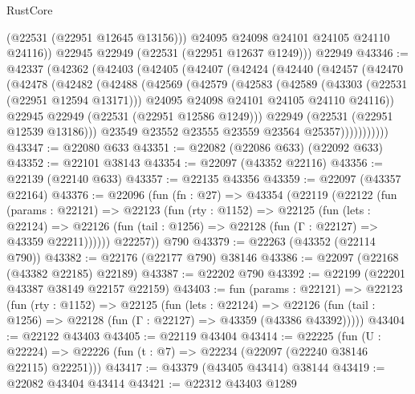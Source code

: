 \begin{lexlean}{RustCore}
\begin{coremodule}
            (@22531 (@22951 @12645 @13156)))
          @24095
          @24098
          @24101
          @24105
          @24110
          @24116))
      @22945
      @22949
      (@22531 (@22951 @12637 @1249)))
    @22949
@43346 := @42337
    (@42362
      (@42403
        (@42405
          (@42407
            (@42424
              (@42440
                (@42457
                  (@42470
                    (@42478
                      (@42482
                        (@42488
                          (@42569
                            (@42579
                              (@42583
                                (@42589
                                  (@43303 (@22531 (@22951 @12594 @13171)))
                                  @24095
                                  @24098
                                  @24101
                                  @24105
                                  @24110
                                  @24116))
                              @22945
                              @22949
                              (@22531 (@22951 @12586 @1249)))
                            @22949
                            (@22531 (@22951 @12539 @13186)))
                          @23549
                          @23552
                          @23555
                          @23559
                          @23564
                          @25357)))))))))))
@43347 := @22080 @633
@43351 := @22082 (@22086 @633) (@22092 @633)
@43352 := @22101 @38143
@43354 := @22097 (@43352 @22116)
@43356 := @22139 (@22140 @633)
@43357 := @22135 @43356
@43359 := @22097 (@43357 @22164)
@43376 := @22096
    (fun (fn : @27) =>
    @43354
      (@22119
        (@22122
          (fun (params : @22121) =>
          @22123
            (fun (rty : @1152) =>
            @22125
              (fun (lets : @22124) =>
              @22126 (fun (tail : @1256) => @22128 (fun (Γ : @22127) => @43359 @22211))))))
        @22257))
    @790
@43379 := @22263 (@43352 (@22114 @790))
@43382 := @22176 (@22177 @790) @38146
@43386 := @22097 (@22168 (@43382 @22185) @22189)
@43387 := @22202 @790
@43392 := @22199 (@22201 @43387 @38149 @22157 @22159)
@43403 := fun (params : @22121) =>
  @22123
    (fun (rty : @1152) =>
    @22125
      (fun (lets : @22124) =>
      @22126 (fun (tail : @1256) => @22128 (fun (Γ : @22127) => @43359 (@43386 @43392)))))
@43404 := @22122 @43403
@43405 := @22119 @43404
@43414 := @22225
    (fun (U : @22224) => @22226 (fun (t : @7) => @22234 (@22097 (@22240 @38146 @22115) @22251)))
@43417 := @43379 (@43405 @43414) @38144
@43419 := @22082 @43404 @43414
@43421 := @22312 @43403 @1289

\end{coremodule}
\end{lexlean}
